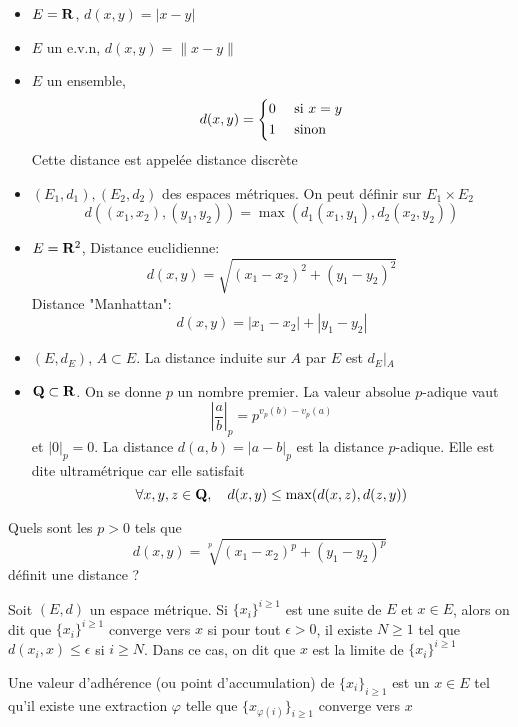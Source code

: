 \begin{ex}
\begin{itemize}
    \item $E=\mathbf R$, $d(x, y)=|x-y|$
    \item  $E$ un e.v.n,  $d(x, y)=\|x-y\|$ 
    \item $E$ un ensemble,  \[
            d(x, y)=
            \begin{dcases}
                0 & \text{ si } x=y \\
                1 & \text{ sinon }
            \end{dcases}
    \] 
    Cette distance est appelée distance discrète
    \item $(E_1, d_1), (E_2, d_2)$ des espaces métriques. On peut définir sur $E_1\times E_2$ \[
            d((x_1, x_2), (y_1, y_2))= \max (d_1(x_1, y_1), d_2(x_2, y_2))
    \]
\item $E=\mathbf R^2 $, Distance euclidienne: \[ d(x, y)=\sqrt{(x_1-x_2)^2 + (y_1-y_2)^2 } \]
    Distance "Manhattan": \[
        d(x, y)=|x_1-x_2|+|y_1-y_2|
    \] 
\item $(E, d_E)$,  $A\subset E$. La distance induite sur  $A$ par  $E$ est  $d_{E}\!\left|_{A}\right.$
    \item  $\mathbf Q\subset \mathbf R$. On se donne $p$ un nombre premier. La valeur absolue  $p$-adique vaut  \[
            \left| \frac{a}{b} \right|_p=p^{v_p(b)-v_p(a)}
    \] 
    et $|0|_p=0$. La distance  $d(a, b)=|a-b|_p$ est la distance $p$-adique. Elle est dite ultramétrique car elle satisfait  \[
        \forall  x, y, z \in  \mathbf Q, \quad d(x, y) \leq  \max (d(x, z), d(z, y))
    \] 
\end{itemize}
\end{ex}

\begin{exo}
Quels sont les $p>0$ tels que  \[
    d(x, y)=\sqrt[p]{(x_1-x_2)^p + (y_1-y_2)^p } 
\] 
définit une distance ?
\end{exo}

\begin{dfn}
    Soit $(E, d)$ un espace métrique. Si  $\{x_i\}^{i\geq 1}$ est une suite de $E$ et  $x \in  E$, alors on dit que $\{x_i\}^{i\geq 1}$ converge vers $x$ si pour tout  $\epsilon>0$, il existe
    $N\geq 1$ tel que $d(x_i, x)\leq \epsilon$ si $i\geq N$. Dans ce cas, on dit que $x$ est la limite de  $\{x_i\}^{i\geq 1}$
\end{dfn}

\begin{dfn}
    Une valeur d'adhérence (ou point d'accumulation) de $\{x_i\}_{i\geq 1}$ est un $x \in  E$ tel qu'il existe une extraction $\varphi$ telle que  $\{x_{\varphi(i)}\}_{i\geq  1}$ converge vers $x$
\end{dfn}

